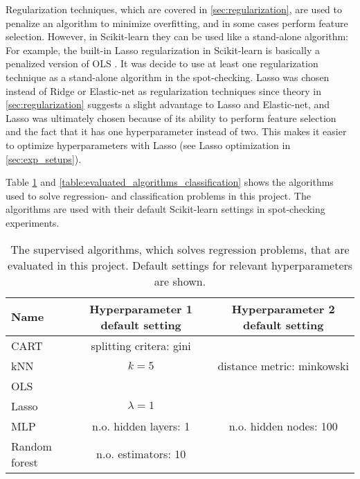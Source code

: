 	Regularization techniques, which are covered in \ref{sec:regularization}, are used to penalize an algorithm to minimize overfitting, and in some cases perform feature selection. However, in Scikit-learn they can be used like a stand-alone algorithm: For example, the built-in Lasso regularization in Scikit-learn is basically a penalized version of OLS \cite{WEBSITE:31}. It was decide to use at least one regularization technique as a stand-alone algorithm in the spot-checking. Lasso was chosen instead of Ridge or Elastic-net as regularization techniques since theory in \ref{sec:regularization} suggests a slight advantage to Lasso and Elastic-net, and Lasso was ultimately chosen because of its ability to perform feature selection and the fact that it has one hyperparameter instead of two. This makes it easier to optimize hyperparameters with Lasso (see Lasso optimization in \ref{sec:exp_setups}). 

	Table \ref{table:evaluated_algorithms_regression} and \ref{table:evaluated_algorithms_classification} shows the algorithms used to solve regression- and classification problems in this project. The algorithms are used with their default Scikit-learn settings in spot-checking experiments.
	\begin{table}[H]
		\centering
		\caption{The supervised algorithms, which solves regression problems, that are evaluated in this project. Default settings for relevant hyperparameters are shown.}
		\begin{tabular}[3]{l | c | c }
    			Name & Hyperparameter 1 default setting & Hyperparameter 2 default setting \\ 
			 \hline
			CART & splitting critera: gini &  \\ \hline
			kNN & $k = 5$ & distance metric: minkowski \\ \hline
			OLS &  & \\ \hline
			Lasso & $\lambda = 1$ & \\ \hline
			MLP & n.o. hidden layers: 1 & n.o. hidden nodes: 100 \\ \hline
			Random forest & n.o. estimators: 10 &   
			\label{table:evaluated_algorithms_regression}
		\end{tabular}
	\end{table}

